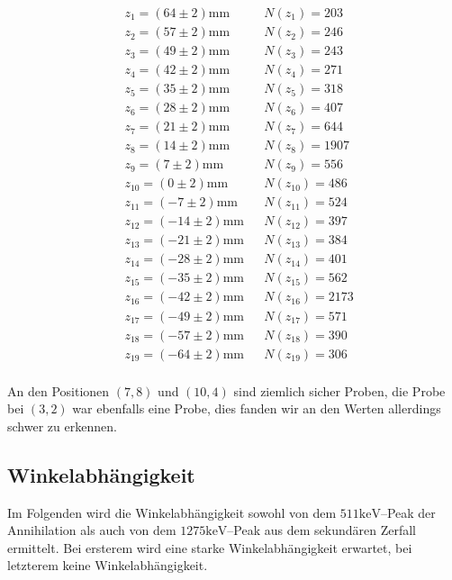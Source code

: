 \documentclass[12pt,a4paper]{scrartcl}
\numberwithin{equation}{section} %
\newcommand{\pu}[1]{\ensuremath{\mathrm{#1}}}
\renewcommand{\[}{} %
\renewcommand{\]}{\noindent} %
\begin{document}
\begin{align*}
    &z_{1} = \pu{(64\pm2) mm} &&
        N(z_{1}) = 203 \\
    &z_{2} = \pu{(57\pm2) mm} &&
        N(z_{2}) = 246 \\
    &z_{3} = \pu{(49\pm2) mm} &&
        N(z_{3}) = 243 \\
    &z_{4} = \pu{(42\pm2) mm} &&
        N(z_{4}) = 271 \\
    &z_{5} = \pu{(35\pm2) mm} &&
        N(z_{5}) = 318 \\
    &z_{6} = \pu{(28\pm2) mm} &&
        N(z_{6}) = 407 \\
    &z_{7} = \pu{(21\pm2) mm} &&
        N(z_{7}) = 644 \\
    &z_{8} = \pu{(14\pm2) mm} &&
        N(z_{8}) = 1907 \\
    &z_{9} = \pu{(7\pm2) mm} &&
        N(z_{9}) = 556 \\
    &z_{10} = \pu{(0\pm2) mm} &&
        N(z_{10}) = 486 \\
    &z_{11} = \pu{(-7\pm2) mm} &&
        N(z_{11}) = 524 \\
    &z_{12} = \pu{(-14\pm2) mm} &&
        N(z_{12}) = 397 \\
    &z_{13} = \pu{(-21\pm2) mm} &&
        N(z_{13}) = 384 \\
    &z_{14} = \pu{(-28\pm2) mm} &&
        N(z_{14}) = 401 \\
    &z_{15} = \pu{(-35\pm2) mm} &&
        N(z_{15}) = 562 \\
    &z_{16} = \pu{(-42\pm2) mm} &&
        N(z_{16}) = 2173 \\
    &z_{17} = \pu{(-49\pm2) mm} &&
        N(z_{17}) = 571 \\
    &z_{18} = \pu{(-57\pm2) mm} &&
        N(z_{18}) = 390 \\
    &z_{19} = \pu{(-64\pm2) mm} &&
        N(z_{19}) = 306 \\
\end{align*}

An den Positionen \((7,8)\) und \((10,4)\) sind ziemlich sicher Proben,
die Probe bei \((3, 2)\) war ebenfalls eine Probe, dies fanden wir an
den Werten allerdings schwer zu erkennen.

\hypertarget{winkelabhuxe4ngigkeit}{%
\subsection{Winkelabhängigkeit}\label{winkelabhuxe4ngigkeit}}

Im Folgenden wird die Winkelabhängigkeit sowohl von dem
\(\pu{511keV}\)--Peak der Annihilation als auch von dem
\(\pu{1275keV}\)--Peak aus dem sekundären Zerfall ermittelt. Bei
ersterem wird eine starke Winkelabhängigkeit erwartet, bei letzterem
keine Winkelabhängigkeit.
\end{document}
